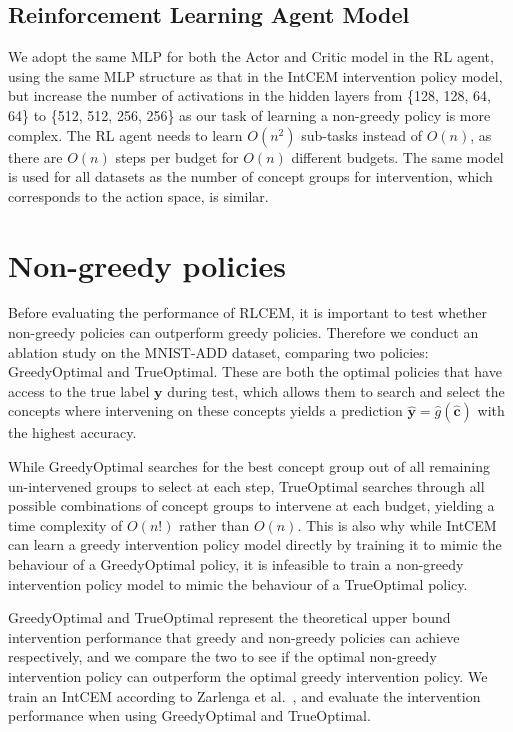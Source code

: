\subsection{Reinforcement Learning Agent Model}
We adopt the same MLP for 
both the Actor and Critic model in the RL agent, 
using the same MLP structure as that in the IntCEM intervention policy model,
but increase the number of activations in the hidden layers
 from \{128, 128, 64, 64\} to \{512, 512, 256, 256\} as
 our task of learning a non-greedy policy is more complex.
 The RL agent needs to learn 
 $O(n^2)$ sub-tasks instead of $O(n)$, as there are $O(n)$ 
steps per budget for $O(n)$ different budgets.
 The same model is used
 for all datasets as the number of concept groups for intervention,
 which corresponds to the action space,
 is similar. 
    
\section{Non-greedy policies}

Before evaluating the performance of RLCEM, it is important to test whether
non-greedy policies can outperform greedy policies. 
Therefore we conduct an
ablation study on the MNIST-ADD dataset, comparing two policies:
GreedyOptimal and TrueOptimal.
These are both the optimal policies that have access to the true label $\mathbf{y}$ during test, which 
allows them to search and select the concepts
where intervening on these concepts yields a prediction
$\hat{\mathbf{y}} = \hat{g}(\hat{\mathbf{c}})$ 
with the highest accuracy.

While GreedyOptimal searches for 
the best concept group
out of all remaining un-intervened groups
to select at each step, TrueOptimal searches through
all possible combinations of concept groups to intervene at each budget, yielding
a time complexity of $O(n!)$ rather than
$O(n)$. This is also why while IntCEM can 
learn a greedy intervention policy model directly
by training it to mimic the behaviour of a GreedyOptimal 
policy, it is infeasible to train a non-greedy intervention policy
model to mimic the behaviour of a TrueOptimal policy.

GreedyOptimal and TrueOptimal represent the theoretical
upper bound intervention performance
that greedy and non-greedy policies can achieve respectively,
and we compare the two to see if the optimal 
non-greedy intervention policy can outperform the 
optimal greedy
intervention policy.
We train an IntCEM according to Zarlenga et al.~\cite{intcem}, 
and evaluate the intervention performance when using
GreedyOptimal and TrueOptimal. 

